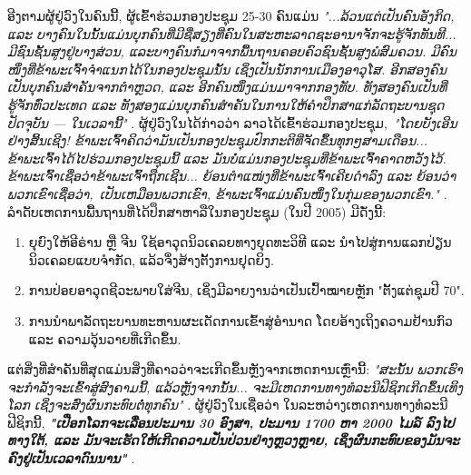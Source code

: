 \documentclass[10pt,twocolumn,letterpaper]{article}
\begin{document}
ອີງຕາມຜູ້ຢູ່ວົງໃນຄົນນີ້, ຜູ້ເຂົ້າຮ່ວມກອງປະຊຸມ 25-30 ຄົນແມ່ນ \textit{"...ລ້ວນແຕ່ເປັນຄົນອັງກິດ, ແລະ ບາງຄົນໃນນັ້ນແມ່ນບຸກຄົນທີ່ມີຊື່ສຽງທີ່ຄົນໃນສະຫະລາດຊະອານາຈັກຈະຮູ້ຈັກທັນທີ... ມີຊົນຊັ້ນສູງຢູ່ບາງສ່ວນ, ແລະບາງຄົນກໍມາຈາກພື້ນຖານຄອບຄົວຊົນຊັ້ນສູງພໍສົມຄວນ. ມີຄົນໜຶ່ງທີ່ຂ້າພະເຈົ້າຈຳແນກໄດ້ໃນກອງປະຊຸມນັ້ນ ເຊິ່ງເປັນນັກການເມືອງອາວຸໂສ. ອີກສອງຄົນເປັນບຸກຄົນສຳຄັນຈາກຕຳຫຼວດ, ແລະ ອີກຄົນໜຶ່ງແມ່ນມາຈາກກອງທັບ. ທັງສອງຄົນເປັນທີ່ຮູ້ຈັກທົ່ວປະເທດ ແລະ ທັງສອງແມ່ນບຸກຄົນສຳຄັນໃນການໃຫ້ຄຳປຶກສາແກ່ລັດຖະບານຊຸດປັດຈຸບັນ — ໃນເວລານີ້"} \cite{4}.
ຜູ້ຢູ່ວົງໃນໄດ້ກ່າວວ່າ ລາວໄດ້ເຂົ້າຮ່ວມກອງປະຊຸມ,\ \textit{"ໂດຍບັງເອີນຢ່າງສິ້ນເຊີງ! ຂ້າພະເຈົ້າຄິດວ່າມັນເປັນກອງປະຊຸມປົກກະຕິທີ່ຈັດຂຶ້ນທຸກໆສາມເດືອນ... ຂ້າພະເຈົ້າໄດ້ໄປຮ່ວມກອງປະຊຸມນີ້ ແລະ ມັນບໍ່ແມ່ນກອງປະຊຸມທີ່ຂ້າພະເຈົ້າຄາດຫວັງໄວ້. ຂ້າພະເຈົ້າເຊື່ອວ່າຂ້າພະເຈົ້າຖືກເຊີນ... ຍ້ອນຕໍາແໜ່ງທີ່ຂ້າພະເຈົ້າເຄີຍດໍາລົງ ແລະ ຍ້ອນວ່າພວກເຂົາເຊື່ອວ່າ, ເປັນເຫມືອນພວກເຂົາ, ຂ້າພະເຈົ້າແມ່ນຄົນໜຶ່ງໃນກຸ່ມຂອງພວກເຂົາ."} \cite{4}. \cite{97}
ລໍາດັບເຫດການພື້ນຖານທີ່ໄດ້ປຶກສາຫາລືໃນກອງປະຊຸມ (ໃນປີ 2005) ມີດັ່ງນີ້: \cite{98}

\begin{flushleft}
\begin{enumerate}
    \item ຍຸຍົງໃຫ້ອີຣ່ານ ຫຼື ຈີນ ໃຊ້ອາວຸດນິວເຄລຍທາງຍຸດທະວິທີ ແລະ ນໍາໄປສູ່ການແລກປ່ຽນນິວເຄລຍແບບຈໍາກັດ, ແລ້ວຈຶ່ງສ້າງຕັ້ງການຢຸດຍິງ.
    \item ການປ່ອຍອາວຸດຊີວະພາບໃສ່ຈີນ, ເຊິ່ງມີລາຍງານວ່າເປັນເປົ້າໝາຍຫຼັກ "ຕັ້ງແຕ່ຊຸມປີ 70".
    \item ການນໍາພາລັດຖະບານທະຫານຜະເດັດການເຂົ້າສູ່ອໍານາດ ໂດຍອ້າງເຖິງຄວາມຢ້ານກົວ ແລະ ຄວາມວຸ້ນວາຍທີ່ເກີດຂຶ້ນ. \cite{99}
\end{enumerate}
\end{flushleft}

ແຕ່ສິ່ງທີ່ສຳຄັນທີ່ສຸດແມ່ນສິ່ງທີ່ຄາວວ່າຈະເກີດຂຶ້ນຫຼັງຈາກເຫດການເຫຼົ່ານີ້: \textit{"ສະນັ້ນ ພວກເຮົາຈະກຳລັງຈະເຂົ້າສູ່ສົງຄາມນີ້, ແລ້ວຫຼັງຈາກນັ້ນ... ຈະມີເຫດການທາງທໍລະນີຟີຊິກເກີດຂຶ້ນເທິງໂລກ ເຊິ່ງຈະສົ່ງຜົນກະທົບຕໍ່ທຸກຄົນ"} \cite{4}.
ຜູ້ຢູ່ວົງໃນເຊື່ອວ່າ ໃນລະຫວ່າງເຫດການທາງທໍລະນີຟີຊິກນີ້, \textit{\textbf{"ເປືອກໂລກຈະເລື່ອນປະມານ 30 ອົງສາ, ປະມານ 1700 ຫາ 2000 ໄມລ໌ ລົງໄປທາງໃຕ້, ແລະ ມັນຈະເຮັດໃຫ້ເກີດຄວາມປັ່ນປ່ວນຢ່າງຫຼວງຫຼາຍ, ເຊິ່ງຜົນກະທົບຂອງມັນຈະຄົງຢູ່ເປັນເວລາດົນນານ"}} \cite{4}. \cite{100}
\end{document}
